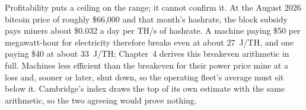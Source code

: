 Profitability puts a ceiling on the range; it cannot confirm it. At the August 2026 bitcoin price of roughly \$66{,}000 and that month's hashrate, the block subsidy pays miners about \$0.032 a day per TH/s of hashrate. %
A machine paying \$50 per megawatt-hour for electricity therefore breaks even at about 27~J/TH, and one paying \$40 at about 33~J/TH; Chapter~4 derives this breakeven arithmetic in full. Machines less efficient than the breakeven for their power price mine at a loss and, sooner or later, shut down, so the operating fleet's average must sit below it. Cambridge's index draws the top of its own estimate with the same arithmetic, so the two agreeing would prove nothing. %

